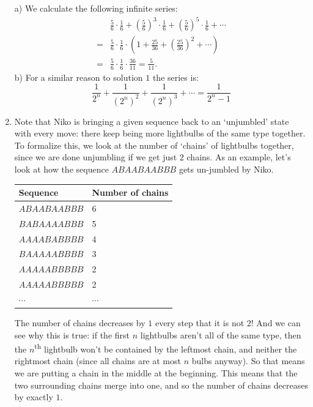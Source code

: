 \documentclass[11pt]{scrartcl}
\begin{document}
\begin{enumerate}[label=\textbf{C\arabic*}.]
    a) We calculate the following infinite series:
    \begin{align*}
    &\frac56 \cdot \frac16 + \left(\frac56\right)^3 \cdot \frac16 + \left(\frac56\right)^5 \cdot \frac16 + \cdots\\
    =&\frac56\cdot\frac16\cdot\left(1 + \frac{25}{36} + \left(\frac{25}{36}\right)^2 + \cdots\right)\\
    =&\frac56\cdot\frac16\cdot\frac{36}{11} = \boxed{\frac{5}{11}}.
    \end{align*}
    b) For a similar reason to solution $1$ the series is:
    $$\frac{1}{2^n} + \frac{1}{(2^n)^2} + \frac{1}{(2^n)^3} + \cdots = \boxed{\frac{1}{2^n-1}}$$

    \item Note that Niko is bringing a given sequence back to an `unjumbled' state with every move: there keep being more lightbulbs of the same type together. To formalize this, we look at the number of `chains' of lightbulbs together, since we are done unjumbling if we get just $2$ chains. As an example, let's look at how the sequence $ABAABAABBB$ gets un-jumbled by Niko.
    
    \begin{table}[ht]
    \centering
    \begin{tabular}{l|l}
    \textbf{Sequence} & \textbf{Number of chains} \\ \hline
    $ABAABAABBB$ & 6 \\
    $BABAAAABBB$ & 5 \\
    $AAAABABBBB$ & 4 \\
    $BAAAAABBBB$ & 3 \\
    $AAAAABBBBB$ & 2 \\
    $AAAAABBBBB$ & 2 \\
    $\cdots$     & $\cdots$
    \end{tabular}
    \end{table}
    
    \vspace{2cm}
    
    The number of chains decreases by $1$ every step that it is not $2$! And we can see why this is true: if the first $n$ lightbulbs aren't all of the same type, then the $n$\textsuperscript{th} lightbulb won't be contained by the leftmost chain, and neither the rightmost chain (since all chains are at most $n$ bulbs anyway). So that means we are putting a chain in the middle at the beginning. This means that the two surrounding chains merge into one, and so the number of chains decreases by exactly $1$.
    

\end{enumerate}
\end{document}

